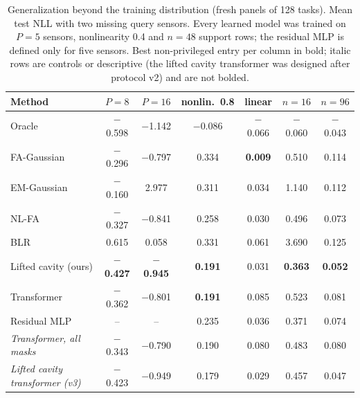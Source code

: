 \begin{table}[t]
\centering\small
\setlength{\tabcolsep}{5pt}
\caption{\label{tab:shift}Generalization beyond the training distribution (fresh panels of 128 tasks). Mean test NLL with two missing query sensors. Every learned model was trained on $P{=}5$ sensors, nonlinearity 0.4 and $n{=}48$ support rows; the residual MLP is defined only for five sensors. Best non-privileged entry per column in bold; italic rows are controls or descriptive (the lifted cavity transformer was designed after protocol v2) and are not bolded.}
\begin{tabular}{lcccccc}
\toprule
Method & $P{=}8$ & $P{=}16$ & nonlin.\ 0.8 & linear & $n{=}16$ & $n{=}96$\\
\midrule
Oracle & $-$0.598 & $-$1.142 & $-$0.086 & $-$0.066 & $-$0.060 & $-$0.043\\\midrule
FA-Gaussian & $-$0.296 & $-$0.797 & 0.334 & \textbf{0.009} & 0.510 & 0.114\\
EM-Gaussian & $-$0.160 & 2.977 & 0.311 & 0.034 & 1.140 & 0.112\\
NL-FA & $-$0.327 & $-$0.841 & 0.258 & 0.030 & 0.496 & 0.073\\
BLR & 0.615 & 0.058 & 0.331 & 0.061 & 3.690 & 0.125\\
Lifted cavity (ours) & \textbf{$-$0.427} & \textbf{$-$0.945} & \textbf{0.191} & 0.031 & \textbf{0.363} & \textbf{0.052}\\
Transformer & $-$0.362 & $-$0.801 & \textbf{0.191} & 0.085 & 0.523 & 0.081\\
Residual MLP & -- & -- & 0.235 & 0.036 & 0.371 & 0.074\\
\emph{Transformer, all masks} & $-$0.343 & $-$0.790 & 0.190 & 0.080 & 0.483 & 0.080\\
\emph{Lifted cavity transformer (v3)} & $-$0.423 & $-$0.949 & 0.179 & 0.029 & 0.457 & 0.047\\
\bottomrule
\end{tabular}
\end{table}
